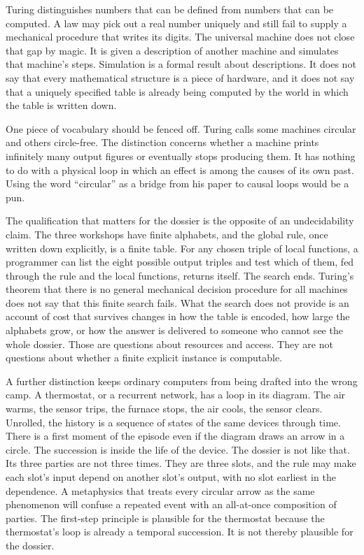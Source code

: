 \documentclass[11pt]{article}
\begin{document}
Turing distinguishes numbers that can be defined from numbers that can be computed. A law may pick out a real number uniquely and still fail to supply a mechanical procedure that writes its digits. The universal machine does not close that gap by magic. It is given a description of another machine and simulates that machine’s steps. Simulation is a formal result about descriptions. It does not say that every mathematical structure is a piece of hardware, and it does not say that a uniquely specified table is already being computed by the world in which the table is written down.

One piece of vocabulary should be fenced off. Turing calls some machines circular and others circle-free. The distinction concerns whether a machine prints infinitely many output figures or eventually stops producing them. It has nothing to do with a physical loop in which an effect is among the causes of its own past. Using the word ``circular'' as a bridge from his paper to causal loops would be a pun.

The qualification that matters for the dossier is the opposite of an undecidability claim. The three workshops have finite alphabets, and the global rule, once written down explicitly, is a finite table. For any chosen triple of local functions, a programmer can list the eight possible output triples and test which of them, fed through the rule and the local functions, returns itself. The search ends. Turing’s theorem that there is no general mechanical decision procedure for all machines does not say that this finite search fails. What the search does not provide is an account of cost that survives changes in how the table is encoded, how large the alphabets grow, or how the answer is delivered to someone who cannot see the whole dossier. Those are questions about resources and access. They are not questions about whether a finite explicit instance is computable.

A further distinction keeps ordinary computers from being drafted into the wrong camp. A thermostat, or a recurrent network, has a loop in its diagram. The air warms, the sensor trips, the furnace stops, the air cools, the sensor clears. Unrolled, the history is a sequence of states of the same devices through time. There is a first moment of the episode even if the diagram draws an arrow in a circle. The succession is inside the life of the device. The dossier is not like that. Its three parties are not three times. They are three slots, and the rule may make each slot’s input depend on another slot’s output, with no slot earliest in the dependence. A metaphysics that treats every circular arrow as the same phenomenon will confuse a repeated event with an all-at-once composition of parties. The first-step principle is plausible for the thermostat because the thermostat’s loop is already a temporal succession. It is not thereby plausible for the dossier.
\end{document}

